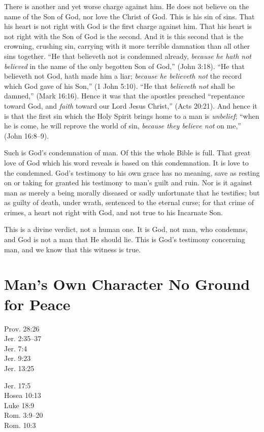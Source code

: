 \documentclass[
]{book}
\begin{document}
There is another and yet worse charge against him. He does not believe on the name of the Son of God, nor love the Christ of God. This is his sin of sins. That his heart is not right with God is the first charge against him. That his heart is not right with the Son of God is the second. And it is this second that is the crowning, crushing sin, carrying with it more terrible damnation than all other sins together. ``He that believeth not is condemned already, \emph{because he hath not believed} in the name of the only begotten Son of God,'' (John 3:18). ``He that believeth not God, hath made him a liar; \emph{because he believeth not} the record which God gave of his Son,'' (1 John 5:10). ``He that \emph{believeth not} shall be damned,'' (Mark 16:16). Hence it was that the apostles preached ``repentance toward God, and \emph{faith} toward our Lord Jesus Christ,'' (Acts 20:21). And hence it is that the first sin which the Holy Spirit brings home to a man is \emph{unbelief}; ``when he is come, he will reprove the world of sin, \emph{because they believe not} on me,'' (John 16:8--9).

Such is God's condemnation of man. Of this the whole Bible is full. That great love of God which his word reveals is based on this condemnation. It is love to the condemned. God's testimony to his own grace has no meaning, save as resting on or taking for granted his testimony to man's guilt and ruin. Nor is it against man as merely a being morally diseased or sadly unfortunate that he testifies; but as guilty of death, under wrath, sentenced to the eternal curse; for that crime of crimes, a heart not right with God, and not true to his Incarnate Son.

This is a divine verdict, not a human one. It is God, not man, who condemns, and God is not a man that He should lie. This is God's testimony concerning man, and we know that this witness is true.

\hypertarget{mans-own-character-no-ground-for-peace}{%
\chapter{Man's Own Character No Ground for Peace}\label{mans-own-character-no-ground-for-peace}}

Prov. 28:26\\
Jer. 2:35--37\\
Jer. 7:4\\
Jer. 9:23\\
Jer. 13:25

Jer. 17:5\\
Hosea 10:13\\
Luke 18:9\\
Rom. 3:9--20\\
Rom. 10:3
\end{document}
